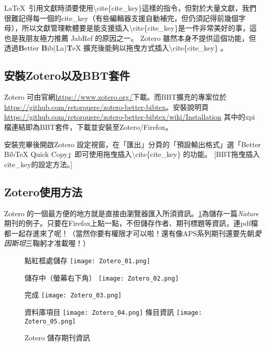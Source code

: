 \documentclass[class=NCU_thesis, crop=false, float=true]{standalone}
\begin{document}
\LaTeX\  引用文獻時須要使用\textbackslash{}cite\{cite\_key\}這樣的指令，但對於大量文獻，我們很難記得每一個的cite\_key（有些編輯器支援自動補完，但仍須記得前幾個字母），所以文獻管理軟體要是能支援插入\textbackslash{}cite\{cite\_key\}是一件非常美好的事，這也是我朋友極力推薦 JabRef 的原因之一。 Zotero 雖然本身不提供這個功能，但透過\textbf{B}etter \textbf{B}ib(La)\textbf{T}eX 擴充後能夠以拖曳方式插入\textbackslash{}cite\{cite\_key\} 。

\subsection{安裝Zotero以及BBT套件}
Zotero 可由官網\url{https://www.zotero.org/}下載。而BBT擴充的專案位於\url{https://github.com/retorquere/zotero-better-bibtex}。安裝說明頁 \url{https://github.com/retorquere/zotero-better-bibtex/wiki/Installation} 其中的xpi檔連結即為BBT套件，下載並安裝至Zotero/Firefox。

安裝完畢後開啟Zotero 設定視窗，在「匯出」分頁的「預設輸出格式」選「Better BibTeX Quick Copy」即可使用拖曳插入\textbackslash{}cite\{cite\_key\} 的功能。
[BBT拖曳插入cite\_key的設定方法。]
\subsection{Zotero使用方法}
Zotero 的一個最方便的地方就是直接由瀏覽器匯入所須資訊。\cref{fig:zotero_save}為儲存一篇\emph{Nature}期刊的例子。只要在Firefox上點一點，不但儲存作者、期刊標題等資訊，連pdf檔都一起存進來了呢！（當然你要有權限才可以啦！還有像APS系列期刊還要先朝\emph{愛因斯坦}三鞠躬才准載喔！）
\begin{figure}
    \centering
    \subcaptionbox
        {點紅框處儲存
        \label{fig:Zotero_01}}
        {\texttt{[image: Zotero\_01.png]}}
        
    \vspace{\baselineskip}
    \subcaptionbox
        {儲存中（螢幕右下角）
        \label{fig:Zotero_02}}
        {\texttt{[image: Zotero\_02.png]}}
        
    \vspace{\baselineskip} %
    \subcaptionbox
        {完成
        \label{fig:Zotero_03}}
        {\texttt{[image: Zotero\_03.png]}}
    
    \vspace{\baselineskip} %
    \subcaptionbox
        {資料庫項目
        \label{fig:Zotero_04}}
        {\texttt{[image: Zotero\_04.png]}}
    \hspace{0.8cm}
    \subcaptionbox
        {條目資訊
        \label{fig:Zotero_05}}
        {\texttt{[image: Zotero\_05.png]}}
    \caption{Zotero 儲存期刊資訊}
    \label{fig:zotero_save}
\end{figure}
\end{document}
